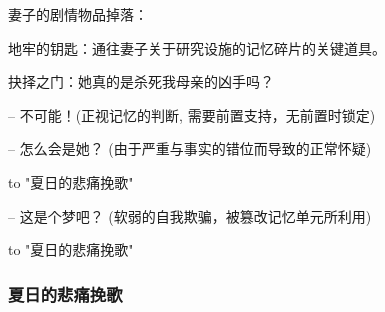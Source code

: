 \documentclass[12pt, a4paper]{article}
\begin{document}
            妻子的剧情物品掉落：

                \quad 地牢的钥匙：通往妻子关于研究设施的记忆碎片的关键道具。

            抉择之门：她真的是杀死我母亲的凶手吗？
                
                \quad -- 不可能！(正视记忆的判断, 需要前置支持，无前置时锁定)
                
                \quad -- 怎么会是她？ (由于严重与事实的错位而导致的正常怀疑) 

                \quad \quad to "夏日的悲痛挽歌"

                \quad -- 这是个梦吧？ (软弱的自我欺骗，被篡改记忆单元所利用) 

                \quad \quad to "夏日的悲痛挽歌"

            \subsubsection*{夏日的悲痛挽歌}
\end{document}
